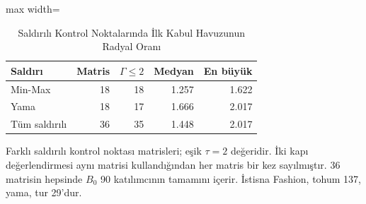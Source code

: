 \begin{table}[!t]
\centering\footnotesize
\setlength{\tabcolsep}{4pt}
\caption{Saldırılı Kontrol Noktalarında İlk Kabul Havuzunun Radyal Oranı}\label{tab:gamma}
\begin{adjustbox}{max width=\columnwidth}
\begin{tabular}{lrrrr}
\toprule
Saldırı & Matris & $\Gamma\leq2$ & Medyan & En büyük \\
\midrule
Min-Max & 18 & 18 & 1.257 & 1.622 \\
Yama & 18 & 17 & 1.666 & 2.017 \\
Tüm saldırılı & 36 & 35 & 1.448 & 2.017 \\
\bottomrule
\end{tabular}
\end{adjustbox}

\par\vspace{3pt}\parbox{\linewidth}{\footnotesize Farklı saldırılı kontrol noktası matrisleri; eşik $\tau=2$ değeridir. İki kapı değerlendirmesi aynı matrisi kullandığından her matris bir kez sayılmıştır. 36 matrisin hepsinde $B_0$ 90 katılımcının tamamını içerir. İstisna Fashion, tohum 137, yama, tur 29'dur.}
\end{table}
